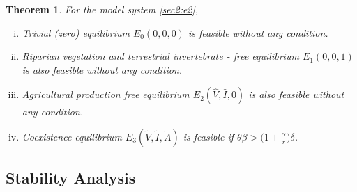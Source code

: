 \documentclass[12pt,a4wide]{report}
\newtheorem{theorem}{Theorem}[section]
\numberwithin{equation}{chapter}
\numberwithin{theorem}{chapter}
\begin{document}
\begin{theorem}\label{Theorem 3.3}
For the model system \eqref{sec2:e2},
\begin{enumerate}[i.)]
\item Trivial (zero) equilibrium $E_0(0,0,0)$ is feasible without any condition.
\item Riparian vegetation and terrestrial invertebrate - free equilibrium $E_1(0,0,1)$ is also feasible without any condition.
\item Agricultural production free equilibrium $E_2(\hat V, \hat I, 0)$ is also feasible without any condition.

\item Coexistence equilibrium  $E_3(\tilde V, \tilde I, \tilde A)$ is feasible if $\theta \beta > \bigg(1+\frac{\alpha}{r}\bigg)\delta$.\\

\end{enumerate}
\end{theorem}
\vspace{-1cm}
\subsection{Stability Analysis}
\end{document}
